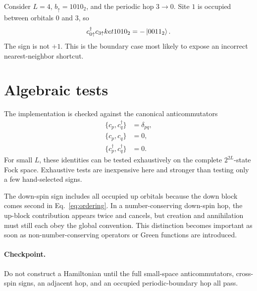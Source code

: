 Consider $L=4$, $b_\uparrow=1010_2$, and the periodic hop $3\to0$.  Site $1$
is occupied between orbitals $0$ and $3$, so
\begin{equation}
c_{0\uparrow}^\dagger c_{3\uparrow}ket{1010_2}=-\left\lvert 0011_2 \right\rangle.
\end{equation}
The sign is not $+1$.  This is the boundary case most likely to expose an
incorrect nearest-neighbor shortcut.



\section{Algebraic tests}

The implementation is checked against the canonical anticommutators
\begin{align}
\{c_p,c_q^\dagger\}&=\delta_{pq},\\
\{c_p,c_q\}&=0,\\
\{c_p^\dagger,c_q^\dagger\}&=0.
\end{align}
For small $L$, these identities can be tested exhaustively on the complete
$2^{2L}$-state Fock space.  Exhaustive tests are inexpensive here and stronger
than testing only a few hand-selected signs.

The down-spin sign includes all occupied up orbitals because the down block
comes second in Eq.~\eqref{eq:ordering}.  In a number-conserving down-spin hop,
the up-block contribution appears twice and cancels, but creation and
annihilation must still each obey the global convention.  This distinction
becomes important as soon as non-number-conserving operators or Green
functions are introduced.

\paragraph{Checkpoint.}
Do not construct a Hamiltonian until the full small-space anticommutators,
cross-spin signs, an adjacent hop, and an occupied periodic-boundary hop all
pass.
